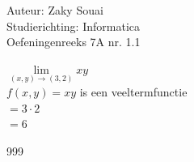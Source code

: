 \documentclass[a4paper]{article}
\begin{document}
  
\noindent \large Auteur: Zaky Souai \\
\noindent \large Studierichting:  Informatica\\
\noindent \large Oefeningenreeks 7A nr. 1.1\\

\bigskip

\normalsize

$ \lim\limits_{(x,y)\rightarrow(3,2)}xy $\\

$f(x,y)=xy$ is een veeltermfunctie\\

$ = 3\cdot 2 $\\

$ = 6 $\\


\begin{thebibliography}{999}
\end{thebibliography}
\end{document}
